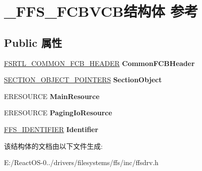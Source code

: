 \hypertarget{struct___f_f_s___f_c_b_v_c_b}{}\section{\+\_\+\+F\+F\+S\+\_\+\+F\+C\+B\+V\+C\+B结构体 参考}
\label{struct___f_f_s___f_c_b_v_c_b}
\subsection*{Public 属性}
\begin{DoxyCompactItemize}
\item 
\mbox{\label{struct___f_f_s___f_c_b_v_c_b_a0ad163ea92f19a49b7f4be88db41d3a9}} 
\hyperlink{struct___f_s_r_t_l___c_o_m_m_o_n___f_c_b___h_e_a_d_e_r}{F\+S\+R\+T\+L\+\_\+\+C\+O\+M\+M\+O\+N\+\_\+\+F\+C\+B\+\_\+\+H\+E\+A\+D\+ER} {\bfseries Common\+F\+C\+B\+Header}
\item 
\mbox{\label{struct___f_f_s___f_c_b_v_c_b_aea584e0c0103f48fd2db88f0bd1eb590}} 
\hyperlink{struct___s_e_c_t_i_o_n___o_b_j_e_c_t___p_o_i_n_t_e_r_s}{S\+E\+C\+T\+I\+O\+N\+\_\+\+O\+B\+J\+E\+C\+T\+\_\+\+P\+O\+I\+N\+T\+E\+RS} {\bfseries Section\+Object}
\item 
\mbox{\label{struct___f_f_s___f_c_b_v_c_b_a7fbe15fcd3720e4c704da2c95003a0e7}} 
E\+R\+E\+S\+O\+U\+R\+CE {\bfseries Main\+Resource}
\item 
\mbox{\label{struct___f_f_s___f_c_b_v_c_b_a1a32d2aba305eb8e8b7dd783e42c7ad7}} 
E\+R\+E\+S\+O\+U\+R\+CE {\bfseries Paging\+Io\+Resource}
\item 
\mbox{\label{struct___f_f_s___f_c_b_v_c_b_a6e9db6ba2a007011b19cbcfac66dde1b}} 
\hyperlink{struct___f_f_s___i_d_e_n_t_i_f_i_e_r}{F\+F\+S\+\_\+\+I\+D\+E\+N\+T\+I\+F\+I\+ER} {\bfseries Identifier}
\end{DoxyCompactItemize}


该结构体的文档由以下文件生成\+:\begin{DoxyCompactItemize}
\item 
E\+:/\+React\+O\+S-\/0../drivers/filesystems/ffs/inc/ffsdrv.\+h\end{DoxyCompactItemize}
